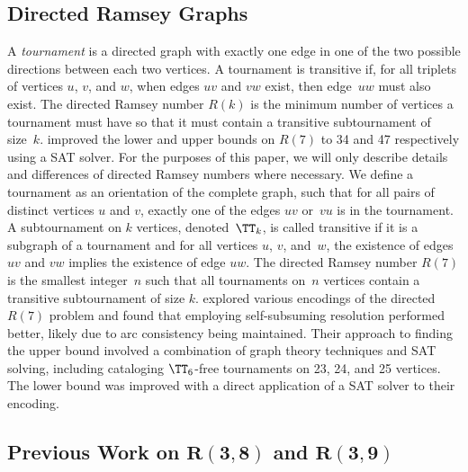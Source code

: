 \subsection{Directed Ramsey Graphs}

A \emph{tournament} is a directed graph with exactly one edge in one of the two possible directions between each two vertices. A tournament is transitive if, for all triplets of vertices $u$, $v$, and $w$, when edges $uv$ and $vw$ exist, then edge~$uw$ must also exist. The directed Ramsey number $R(k)$ is the minimum number of vertices a tournament must have so that it must contain a transitive subtournament of size~$k$.  improved the lower and upper bounds on $R(7)$ to 34 and 47 respectively using a SAT solver.
For the purposes of this paper, we will only describe details and differences of directed Ramsey numbers where necessary. We define a tournament as an orientation of the complete graph, such that for all pairs of distinct vertices $u$ and $v$, exactly one of the edges $uv$ or~$vu$ is in the tournament. 
A subtournament on $k$ vertices, denoted~$\TT_k$, is called transitive if it is a subgraph of a tournament and for all vertices $u$, $v$, and~$w$, the existence of edges $uv$ and $vw$ implies the existence of edge $uw$. 
The directed Ramsey number $R(7)$ is the smallest integer~$n$ such that all tournaments on~$n$ vertices contain a transitive subtournament of size $k$.
 explored various encodings of the directed $R(7)$ problem and found that employing self-subsuming resolution performed better, likely due to arc consistency being maintained. 
Their approach to finding the upper bound involved a combination of graph theory techniques and SAT solving, including cataloging $\TT_6$-free 
tournaments on 23, 24, and 25 vertices. The lower bound was improved with a direct application of a SAT solver to their encoding.


\subsection{Previous Work on \texorpdfstring{$\boldsymbol{R(3, 8)}$}{\textbf{R(3,8)}} and \texorpdfstring{$\boldsymbol{R(3, 9)}$}{\textbf{R(3,9)}}}

